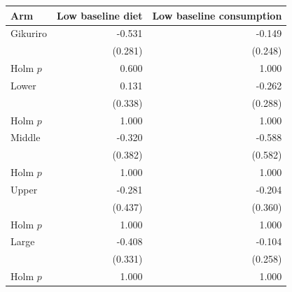 \begin{tabular}{lrr}
\toprule
Arm & Low baseline diet & Low baseline consumption \\
\midrule
Gikuriro & -0.531 & -0.149 \\
 & (0.281) & (0.248) \\
Holm $p$ & 0.600 & 1.000 \\
Lower & 0.131 & -0.262 \\
 & (0.338) & (0.288) \\
Holm $p$ & 1.000 & 1.000 \\
Middle & -0.320 & -0.588 \\
 & (0.382) & (0.582) \\
Holm $p$ & 1.000 & 1.000 \\
Upper & -0.281 & -0.204 \\
 & (0.437) & (0.360) \\
Holm $p$ & 1.000 & 1.000 \\
Large & -0.408 & -0.104 \\
 & (0.331) & (0.258) \\
Holm $p$ & 1.000 & 1.000 \\
\bottomrule
\end{tabular}
